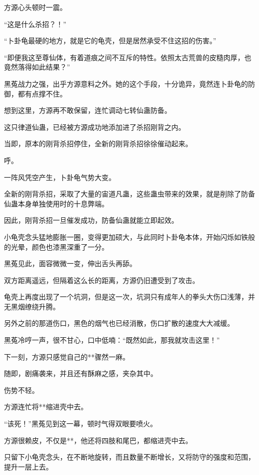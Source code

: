 
\begin{this_body}

方源心头顿时一震。

“这是什么杀招？！”

“卜卦龟最硬的地方，就是它的龟壳，但是居然承受不住这招的伤害。”

“即便我这至尊仙体，有着道痕之间不互斥的特性。依照太古荒兽的皮糙肉厚，也竟然落得如此结果？”

黑菟战力之强，出乎方源意料之外。她的这个手段，十分诡异，竟然连卜卦龟的防御，都有点撑不住。

想到这里，方源再不敢保留，连忙调动七转仙蛊防备。

这只律道仙蛊，已经被方源成功地添加进了杀招刚背之内。

当即，原本的刚背杀招停住，全新的刚背杀招徐徐催动起来。

呼。

一阵风凭空产生，卜卦龟气势大变。

全新的刚背杀招，采取了大量的宙道凡蛊，这些蛊虫带来的效果，就是削除了防备仙蛊本身单独使用时的十息弊端。

因此，刚背杀招一旦催发成功，防备仙蛊就能立即起效。

小龟壳念头猛地膨胀一圈，变得更加硕大，与此同时卜卦龟本体，开始闪烁如铁般的光晕，颜色也漆黑深重了一分。

黑菟见此，面容微微一变，伸出舌头再舔。

双方距离遥远，但隔着这么长的距离，方源仍旧遭受到了攻击。

龟壳上再度出现了一个坑洞，但是这一次，坑洞只有成年人的拳头大伤口浅薄，并无黑烟缭绕升腾。

另外之前的那道伤口，黑色的烟气也已经消散，伤口扩散的速度大大减缓。

黑菟冷哼一声，很不甘心，口中低喃：“既然如此，那我就攻击这里！”

下一刻，方源只感觉自己的**骤然一麻。

随即，剧痛袭来，并且还有酥麻之感，夹杂其中。

伤势不轻。

方源连忙将**缩进壳中去。

“该死！”黑菟见到这一幕，顿时气得双眼要喷火。

方源很赖皮，不仅是**，他还将四肢和尾巴，都缩进壳中去。

只留下小龟壳念头，在不断地旋转，而且数量不断增长，又将防守的强度和范围，提升一层上去。


\end{this_body}
